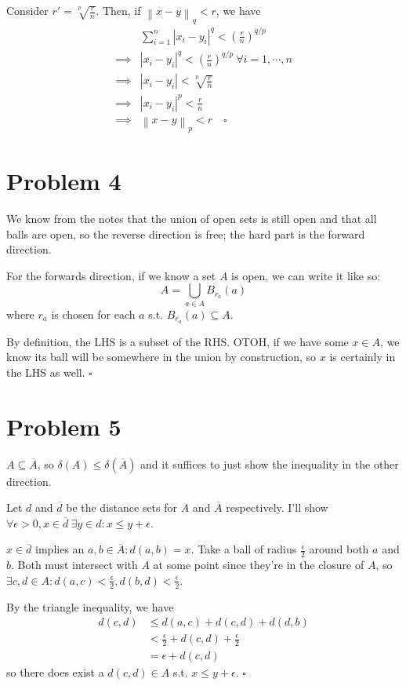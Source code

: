 \documentclass[12pt]{article}
\newcommand{\norm}[1]{\left\lVert#1\right\rVert}
\begin{document}
Consider $r'=\sqrt[p]{\frac{r}{n}}$.
Then, if $\norm{x-y}_q < r$, we have
\begin{align*}
  & \sum_{i=1}^{n} |x_i-y_i|^q < \left(\frac{r}{n}\right)^{q/p} \\
  \implies{} & |x_i-y_i|^q < \left(\frac{r}{n}\right)^{q/p}\ \forall i=1, \cdots, n \\
  \implies{} & |x_i-y_i| < \sqrt[p]{\frac{r}{n}} \\
  \implies{} & |x_i-y_i|^p < \frac{r}{n} \\
  \implies{} & \norm{x-y}_p < r\quad\square
\end{align*}

\section{Problem 4}

We know from the notes that the union of open sets is still open and that all balls are open,
so the reverse direction is free; the hard part is the forward direction.

For the forwards direction, if we know a set $A$ is open, we can write it like so:
\[A=\bigcup_{a \in A} B_{r_a}(a)\]
where $r_a$ is chosen for each $a$ s.t. $B_{r_a}(a) \subseteq A$.

By definition, the LHS is a subset of the RHS.
OTOH, if we have some $x \in A$, we know its ball will be somewhere in the union by construction,
so $x$ is certainly in the LHS as well. $\square$

\pagebreak

\section{Problem 5}

$A \subseteq \overline{A}$, so $\delta(A) \le \delta(\overline{A})$
and it suffices to just show the inequality in the other direction.

Let $d$ and $\overline{d}$ be the distance sets for $A$ and $\overline{A}$ respectively.
I'll show $\forall \epsilon > 0, x \in \overline{d}\ \exists y \in d: x \le y + \epsilon$.

$x \in \overline{d}$ implies an $a, b \in \overline{A}: d(a, b)=x$.
Take a ball of radius $\frac{\epsilon}{2}$ around both $a$ and $b$.
Both must intersect with $A$ at some point since they're in the closure of $A$,
so $\exists c, d \in A: d(a, c) < \frac{\epsilon}{2}, d(b, d) < \frac{\epsilon}{2}$.

By the triangle inequality, we have
\begin{align*}
    d(c, d)
    &\le d(a, c) + d(c, d) + d(d, b) \\
    &< \frac{\epsilon}{2} + d(c, d) + \frac{\epsilon}{2} \\
    &= \epsilon + d(c, d)
\end{align*}
so there does exist a $d(c, d) \in A$ s.t. $x \le y+\epsilon$. $\square$
\end{document}
